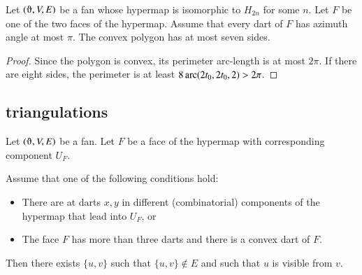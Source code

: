 \begin{lemma}
    \label{lemma:7-sides}
Let $(\orgn,V,E)$ be a fan whose hypermap is isomorphic
to $H_{2n}$ for some $n$.  Let $F$ be one of the two faces of the
hypermap.  Assume that every dart of $F$ has azimuth angle at
most $\pi$.  
The convex polygon has at most seven sides.
\end{lemma}

\begin{proof}
Since the polygon is convex, its perimeter arc-length is at
most $2\pi$.  If there are eight sides, the perimeter
is at least $8\operatorname{arc}(2t_0,2t_0,2)>2\pi$.
\end{proof}




\subsection{triangulations}

Let $(\orgn,V,E)$ be a fan.  Let $F$ be a face of the hypermap
with corresponding component $U_F$.

\begin{lemma} Assume that one of the following conditions hold:
\begin{itemize} 
  \item There are at darts $x,y$ in different (combinatorial) components of the 
   hypermap that lead into $U_F$, or
  \item The face $F$ has more than three darts and there is a convex dart of $F$.
\end{itemize}
Then there exists $\{u,v\}$ such that $\{u,v\}\not\in E$ and such
that $u$ is visible from $v$.
\end{lemma}

